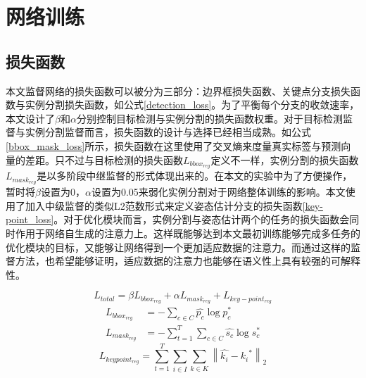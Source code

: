 \section{网络训练}
\label{sec:training}
\subsection{损失函数}
\label{subsec:lossfuntion}

本文监督网络的损失函数可以被分为三部分：边界框损失函数、关键点分支损失函数与实例分割损失函数，如公式\eqref{detection_loss}。为了平衡每个分支的收敛速率，本文设计了$\beta$和$\alpha$分别控制目标检测与实例分割的损失函数权重。对于目标检测监督与实例分割监督而言，损失函数的设计与选择已经相当成熟。如公式\eqref{bbox_mask_loss}所示，损失函数在这里使用了交叉熵来度量真实标签与预测向量的差距。只不过与目标检测的损失函数$L_{bbox_{reg}}$定义不一样，实例分割的损失函数$L_{mask_{reg}}$是以多阶段中继监督的形式体现出来的。在本文的实验中为了方便操作，暂时将$\beta$设置为0，$\alpha$设置为0.05来弱化实例分割对于网络整体训练的影响。本文使用了加入中级监督的类似L2范数形式来定义姿态估计分支的损失函数\eqref{key-point_loss}。对于优化模块而言，实例分割与姿态估计两个的任务的损失函数会同时作用于网络自生成的注意力上。这样既能够达到本文最初训练能够完成多任务的优化模块的目标，又能够让网络得到一个更加适应数据的注意力。而通过这样的监督方法，也希望能够证明，适应数据的注意力也能够在语义性上具有较强的可解释性。

\begin{equation}
\label{detection_loss}
L_{total} = \beta L_{bbox_{reg}} + \alpha L_{mask_{reg}} + L_{key-point_{reg}}
\end{equation} 
\begin{equation}
\label{bbox_mask_loss}
\begin{aligned}
L_{bbox_{reg}} &= -\sum_{c \in C}{\hat{p_c} \log{p_c^{*}}} \\
L_{mask_{reg}} &= -\sum_{t=1}^{T}\sum_{c \in C}{\hat{s_c} \log{s_c^{*}}}
\end{aligned}
\end{equation}
\begin{equation}
\label{key-point_loss}
L_{keypoint_{reg}} = \sum_{t=1}^{T}\sum_{i \in I}\sum_{k \in K}{\left\| \hat{k_i} - {k_i}^{*} \right\|_2}
\end{equation}

